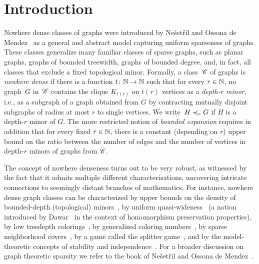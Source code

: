 \section{Introduction}\label{sec:intro}

Nowhere dense classes of graphs were introduced by Ne\v set\v ril and
Ossona de Mendez~\cite{nevsetvril2010first,nevsetvril2011nowhere} as a
general and abstract model capturing uniform sparseness of
graphs. These classes generalize many familiar classes of sparse
graphs, such as planar graphs, graphs of bounded treewidth, graphs of
bounded degree, and, in fact, all classes that exclude a fixed
topological minor.  Formally, a class~$\mathscr{C}$ of graphs is {\em{nowhere
    dense}} if there is a function $t\colon \mathbb{N}\to \mathbb{N}$ such that for
every $r\in \mathbb{N}$, no graph~$G$ in~$\mathscr{C}$ contains the clique $K_{t(r)}$
on $t(r)$ vertices as a {\em{depth-$r$ minor}}, i.e., as a subgraph of a
graph obtained from $G$ by contracting mutually disjoint subgraphs of
radius at most $r$ to single vertices.  We write~$H\preccurlyeq_r G$ if $H$
is a depth-$r$ minor of $G$.  The more restricted notion of
{\em{bounded expansion}} requires in addition that for every fixed
$r\in\mathbb{N}$, there is a constant (depending on $r$) upper bound on the
ratio between the number of edges and the number of vertices in
depth-$r$ minors of graphs from $\mathscr{C}$.

The concept of nowhere denseness turns out to be very robust, as
witnessed by the fact that it admits multiple different
characterizations, uncovering intricate connections to seemingly
distant branches of mathematics.  For instance, nowhere dense graph
classes can be characterized by upper bounds on the density of
bounded-depth (topological)
minors~\cite{nevsetvril2010first,nevsetvril2011nowhere}, by uniform
quasi-wideness~\cite{nevsetvril2011nowhere} (a notion introduced by
Dawar~\cite{Dawar07} in the context of homomorphism preservation
properties), by low treedepth colorings~\cite{nevsetvril2008grad}, by
generalized coloring numbers~\cite{zhu2009coloring}, by sparse
neighborhood covers~\cite{GroheKRSS15,grohe2014deciding}, by a game
called the splitter game~\cite{grohe2014deciding}, and by the
model-theoretic concepts of stability and
independence~\cite{adler2014interpreting}.  For a broader discussion
on graph theoretic sparsity we refer to the book of Ne\v{s}et\v{r}il
and Ossona de Mendez~\cite{sparsity}.

